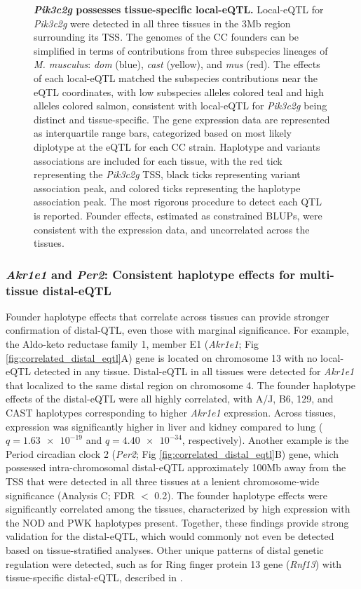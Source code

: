 \documentclass[10pt,letterpaper]{article}
\begin{document}
\begin{figure}[h!]
\caption{\textbf{\textit{Pik3c2g} possesses tissue-specific local-eQTL.} Local-eQTL for \textit{Pik3c2g} were detected in all three tissues in the 3Mb region surrounding its TSS. The genomes of the CC founders can be simplified in terms of contributions from three subspecies lineages of \textit{M. musculus}: \textit{dom} (blue), \textit{cast} (yellow), and \textit{mus} (red). The effects of each local-eQTL matched the subspecies contributions near the eQTL coordinates, with low subspecies alleles colored teal and high alleles colored salmon, consistent with local-eQTL for \textit{Pik3c2g} being distinct and tissue-specific. The gene expression data are represented as interquartile range bars, categorized based on most likely diplotype at the eQTL for each CC strain. Haplotype and variants associations are included for each tissue, with the red tick representing the \textit{Pik3c2g} TSS, black ticks representing variant association peak, and colored ticks representing the haplotype association peak. The most rigorous procedure to detect each QTL is reported. Founder effects, estimated as constrained BLUPs, were consistent with the expression data, and uncorrelated across the tissues.
\label{fig:pik3c2g}}
\end{figure}

\subsubsection*{\textit{Akr1e1} and \textit{Per2}: Consistent haplotype effects for multi-tissue distal-eQTL}
Founder haplotype effects that correlate across tissues can provide stronger confirmation of distal-QTL, even those with marginal significance. 
For example, the Aldo-keto reductase family 1, member E1 (\textit{Akr1e1}; Fig \ref{fig:correlated_distal_eqtl}A) gene is located on chromosome 13 with no local-eQTL detected in any tissue. Distal-eQTL in all tissues were detected for \textit{Akr1e1} that localized to the same distal region on chromosome 4. The founder haplotype effects of the distal-eQTL were all highly correlated, with A/J, B6, 129, and CAST haplotypes corresponding to higher \textit{Akr1e1} expression. Across tissues, expression was significantly higher in liver and kidney compared to lung ($q = \num{1.63e-19}$ and $q = \num{4.40e-34}$, respectively).
Another example is the Period circadian clock 2 (\textit{Per2}; Fig \ref{fig:correlated_distal_eqtl}B) gene, which possessed intra-chromosomal distal-eQTL approximately 100Mb away from the TSS that were detected in all three tissues at a lenient chromosome-wide significance (Analysis C; FDR $<$ 0.2). The founder haplotype effects were significantly correlated among the tissues, characterized by high expression with the NOD and PWK haplotypes present. Together, these findings provide strong validation for the distal-eQTL, which would commonly not even be detected based on tissue-stratified analyses.
Other unique patterns of distal genetic regulation were detected, such as for Ring finger protein 13 gene (\textit{Rnf13}) with tissue-specific distal-eQTL, described in .
\end{document}

